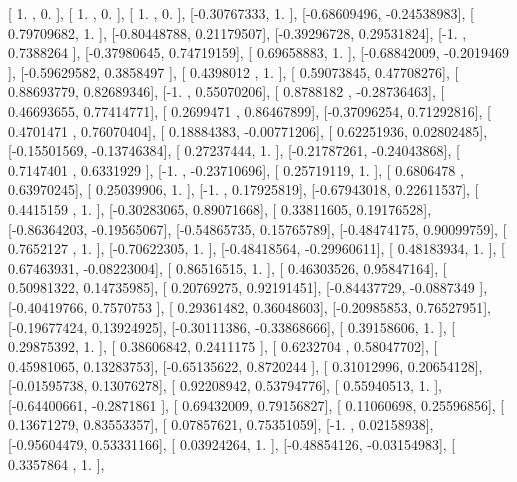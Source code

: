 \documentclass{article}
\begin{document}
       [ 1.        ,  0.        ],
       [ 1.        ,  0.        ],
       [ 1.        ,  0.        ],
       [-0.30767333,  1.        ],
       [-0.68609496, -0.24538983],
       [ 0.79709682,  1.        ],
       [-0.80448788,  0.21179507],
       [-0.39296728,  0.29531824],
       [-1.        ,  0.7388264 ],
       [-0.37980645,  0.74719159],
       [ 0.69658883,  1.        ],
       [-0.68842009, -0.2019469 ],
       [-0.59629582,  0.3858497 ],
       [ 0.4398012 ,  1.        ],
       [ 0.59073845,  0.47708276],
       [ 0.88693779,  0.82689346],
       [-1.        ,  0.55070206],
       [ 0.8788182 , -0.28736463],
       [ 0.46693655,  0.77414771],
       [ 0.2699471 ,  0.86467899],
       [-0.37096254,  0.71292816],
       [ 0.4701471 ,  0.76070404],
       [ 0.18884383, -0.00771206],
       [ 0.62251936,  0.02802485],
       [-0.15501569, -0.13746384],
       [ 0.27237444,  1.        ],
       [-0.21787261, -0.24043868],
       [ 0.7147401 ,  0.6331929 ],
       [-1.        , -0.23710696],
       [ 0.25719119,  1.        ],
       [ 0.6806478 ,  0.63970245],
       [ 0.25039906,  1.        ],
       [-1.        ,  0.17925819],
       [-0.67943018,  0.22611537],
       [ 0.4415159 ,  1.        ],
       [-0.30283065,  0.89071668],
       [ 0.33811605,  0.19176528],
       [-0.86364203, -0.19565067],
       [-0.54865735,  0.15765789],
       [-0.48474175,  0.90099759],
       [ 0.7652127 ,  1.        ],
       [-0.70622305,  1.        ],
       [-0.48418564, -0.29960611],
       [ 0.48183934,  1.        ],
       [ 0.67463931, -0.08223004],
       [ 0.86516515,  1.        ],
       [ 0.46303526,  0.95847164],
       [ 0.50981322,  0.14735985],
       [ 0.20769275,  0.92191451],
       [-0.84437729, -0.0887349 ],
       [-0.40419766,  0.7570753 ],
       [ 0.29361482,  0.36048603],
       [-0.20985853,  0.76527951],
       [-0.19677424,  0.13924925],
       [-0.30111386, -0.33868666],
       [ 0.39158606,  1.        ],
       [ 0.29875392,  1.        ],
       [ 0.38606842,  0.2411175 ],
       [ 0.6232704 ,  0.58047702],
       [ 0.45981065,  0.13283753],
       [-0.65135622,  0.8720244 ],
       [ 0.31012996,  0.20654128],
       [-0.01595738,  0.13076278],
       [ 0.92208942,  0.53794776],
       [ 0.55940513,  1.        ],
       [-0.64400661, -0.2871861 ],
       [ 0.69432009,  0.79156827],
       [ 0.11060698,  0.25596856],
       [ 0.13671279,  0.83553357],
       [ 0.07857621,  0.75351059],
       [-1.        ,  0.02158938],
       [-0.95604479,  0.53331166],
       [ 0.03924264,  1.        ],
       [-0.48854126, -0.03154983],
       [ 0.3357864 ,  1.        ],
\end{document}
